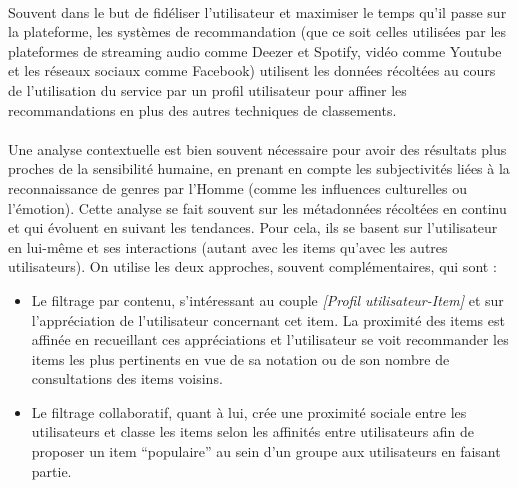 \documentclass{ir}
\begin{document}
\paragraph{}
Souvent dans le but de fidéliser l’utilisateur et maximiser le temps qu’il passe sur la plateforme, les 
systèmes de recommandation (que ce soit celles utilisées par les plateformes de streaming audio comme Deezer 
et Spotify, vidéo comme Youtube et les réseaux sociaux comme Facebook) utilisent les données récoltées au 
cours de l’utilisation du service par un profil utilisateur pour affiner les recommandations en plus des 
autres techniques de classements.

\paragraph{}
Une analyse contextuelle est bien souvent nécessaire pour avoir des résultats plus proches de la sensibilité 
humaine, en prenant en compte les subjectivités liées à la reconnaissance de genres par l’Homme (comme les 
influences culturelles ou l’émotion). Cette analyse se fait souvent sur les métadonnées récoltées en continu 
et qui évoluent en suivant les tendances. Pour cela, ils se basent sur l’utilisateur en lui-même et ses 
interactions (autant avec les items qu’avec les autres utilisateurs). On utilise les deux approches, souvent 
complémentaires, qui sont : 
\begin{itemize}
    \item{Le filtrage par contenu, s'intéressant au couple \textit{[Profil utilisateur-Item]} et sur l’appréciation 
    de l’utilisateur concernant cet item. La proximité des items est affinée en recueillant ces appréciations 
    et l’utilisateur se voit recommander les items les plus pertinents en vue de sa notation ou de son 
    nombre de consultations des items voisins.}
    \\
    \item{Le filtrage collaboratif, quant à lui, crée une proximité sociale entre les utilisateurs et classe 
    les items selon les affinités entre utilisateurs afin de proposer un item “populaire” au sein d’un 
    groupe aux utilisateurs en faisant partie.}
\end{itemize}
\end{document}
